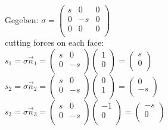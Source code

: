 \documentclass[a4paper, 10pt]{scrartcl}
\begin{document}
\begin{minipage}{14cm}
	Gegeben: $\sigma = \begin{pmatrix}
	s & 0 & 0\\
	0 & -s & 0\\
	0 & 0 & 0\\
	\end{pmatrix} $\\
	cutting forces on each face:\\
	$s_1 = \sigma \vec n_1 = \begin{pmatrix}
	s & 0\\
	0 & -s\\
	\end{pmatrix} \begin{pmatrix}
	1\\
	0\\
	\end{pmatrix} = \begin{pmatrix}
	s\\
	0\\
	\end{pmatrix}$\\
	
	$s_2 = \sigma \vec n_2 = \begin{pmatrix}
	s & 0\\
	0 & -s\\
	\end{pmatrix} \begin{pmatrix}
	0\\
	1\\
	\end{pmatrix} = \begin{pmatrix}
	0\\
	-s\\
	\end{pmatrix}$\\
	
	$s_3 = \sigma \vec n_3 = \begin{pmatrix}
	s & 0\\
	0 & -s\\
	\end{pmatrix} \begin{pmatrix}
	-1\\
	0\\
	\end{pmatrix} = \begin{pmatrix}
	-s\\
	0\\
	\end{pmatrix}$\\
	

\end{minipage}
\end{document}
